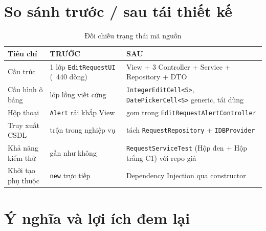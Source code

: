 \documentclass[12pt,a4paper]{article}
\begin{document}
\section{So sánh trước / sau tái thiết kế}

\begin{table}[H]
\centering
\caption{Đối chiếu trạng thái mã nguồn}
\begin{tabularx}{\textwidth}{p{3.2cm} Y Y}
\hline
{}
\textbf{Tiêu chí} & \textbf{TRƯỚC} & \textbf{SAU} \\
\hline
Cấu trúc & 1 lớp \texttt{EditRequestUI} (~440 dòng) & View + 3 Controller + Service + Repository + DTO \\
\hline
Cấu hình ô bảng & lớp lồng viết cứng & \texttt{IntegerEditCell<S>}, \texttt{DatePickerCell<S>} generic, tái dùng \\
\hline
Hộp thoại & \texttt{Alert} rải khắp View & gom trong \texttt{EditRequestAlertController} \\
\hline
Truy xuất CSDL & trộn trong nghiệp vụ & tách \texttt{RequestRepository} + \texttt{IDBProvider} \\
\hline
Khả năng kiểm thử & gần như không & \texttt{RequestServiceTest} (Hộp đen + Hộp trắng C1) với repo giả \\
\hline
Khởi tạo phụ thuộc & \texttt{new} trực tiếp & Dependency Injection qua constructor \\
\hline
\end{tabularx}
\end{table}

\section{Ý nghĩa và lợi ích đem lại}
\end{document}
